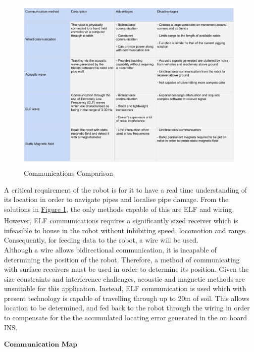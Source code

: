 \documentclass[11pt]{article}		%
\newcommand{\supercite}[1]{\textsuperscript{\cite{#1}}}		%
\newcommand{\figref}[1]{\hyperref[#1]{Figure \ref*{#1}}}    %
\begin{document}
	        \begin{figure}[h]
				\centering
				\includegraphics[width=1\textwidth]{commstable.pdf}
				\caption{Communications Comparison}
				\label{commsTable}
			\end{figure}
	     	A critical requirement of the robot is for it to have a real time understanding of its location in order to navigate pipes and localise pipe damage. 
	     	From the solutions in \figref{commsTable}, the only methods capable of this are ELF and wiring. 
	     	However, ELF communications requires a significantly sized receiver\supercite{elfreceiversize} which is infeasible to house in the robot without inhibiting speed, locomotion and range. 
	     	Consequently, for feeding data to the robot, a wire will be used.
	        \\ 
	        \hspace*{3ex}Although a wire allows bidirectional communication, it is incapable of determining the position of the robot. 
	        Therefore, a method of communicating with surface receivers must be used in order to determine its position. 
	        Given the size constraints and interference challenges, acoustic and magnetic methods are unsuitable for this application. 
	        Instead, ELF communication is used which with present technology is capable of travelling through up to 20m of soil. 
	        This allows location to be determined, and fed back to the robot through the wiring in order to compensate for the the accumulated locating error generated in the on board INS.
	         
	        $\textbf{Communication Map}$
	        
\end{document}
